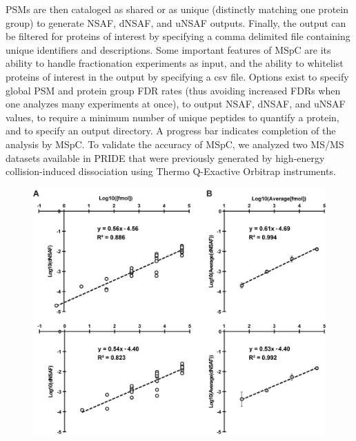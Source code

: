 PSMs are then cataloged as shared or as unique (distinctly matching one protein group) to generate NSAF, dNSAF, and uNSAF outputs.
Finally, the output can be filtered for proteins of interest by specifying a comma delimited file containing unique identifiers and descriptions.
Some important features of MSpC are its ability to handle fractionation experiments as input, and the ability to whitelist proteins of interest in the output by specifying a csv file.
Options exist to specify global PSM and protein group FDR rates (thus avoiding increased FDRs when one analyzes many experiments at once), to output NSAF, dNSAF, and uNSAF values, to require a minimum number of unique peptides to quantify a protein, and to specify an output directory.
A progress bar indicates completion of the analysis by MSpC.
To validate the accuracy of MSpC, we analyzed two MS/MS datasets available in PRIDE that were previously generated by high-energy collision-induced dissociation using Thermo Q-Exactive Orbitrap instruments.
\begin{figure}[p]
	\centering
	\includegraphics[width=\columnwidth]{MSpC/figure1.png}
	\label{fig:UPS2}
\end{figure}

